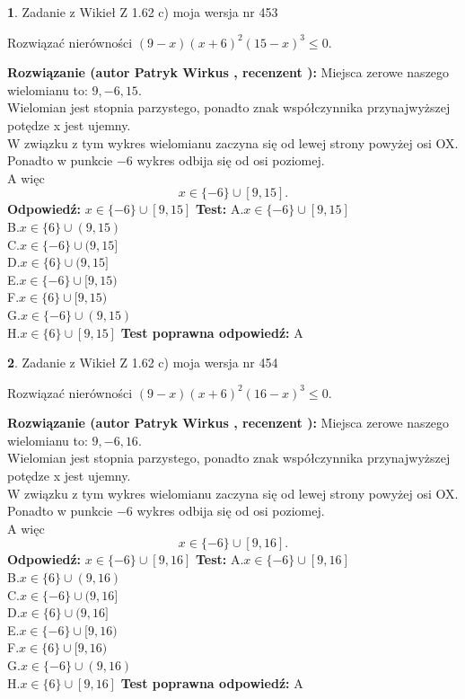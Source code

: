 \documentclass[12pt, a4paper]{article}
\theoremstyle{definition} %
\newtheorem{zad}{}
\newcommand{\zadStart}[1]{\begin{zad}#1\newline}
\newcommand{\zadStop}{\end{zad}}
\newcommand{\rozwStart}[2]{\noindent \textbf{Rozwiązanie (autor #1 , recenzent #2): }\newline}
\newcommand{\rozwStop}{\newline}
\newcommand{\odpStart}{\noindent \textbf{Odpowiedź:}\newline}
\newcommand{\odpStop}{\newline}
\newcommand{\testStart}{\noindent \textbf{Test:}\newline}
\newcommand{\testStop}{\newline}
\newcommand{\kluczStart}{\noindent \textbf{Test poprawna odpowiedź:}\newline}
\newcommand{\kluczStop}{\newline}
\begin{document}
\zadStart{Zadanie z Wikieł Z 1.62 c) moja wersja nr 453}

Rozwiązać nierówności $(9-x)(x+6)^{2}(15-x)^{3}\le0$.
\zadStop
\rozwStart{Patryk Wirkus}{}
Miejsca zerowe naszego wielomianu to: $9, -6, 15$.\\
Wielomian jest stopnia parzystego, ponadto znak współczynnika przy\linebreak najwyższej potędze x jest ujemny.\\ W związku z tym wykres wielomianu zaczyna się od lewej strony powyżej osi OX.\\
Ponadto w punkcie $-6$ wykres odbija się od osi poziomej.\\
A więc $$x \in \{-6\} \cup [9,15].$$
\rozwStop
\odpStart
$x \in \{-6\} \cup [9,15]$
\odpStop
\testStart
A.$x \in \{-6\} \cup [9,15]$\\
B.$x \in \{6\} \cup (9,15)$\\
C.$x \in \{-6\} \cup (9,15]$\\
D.$x \in \{6\} \cup (9,15]$\\
E.$x \in \{-6\} \cup [9,15)$\\
F.$x \in \{6\} \cup [9,15)$\\
G.$x \in \{-6\} \cup (9,15)$\\
H.$x \in \{6\} \cup [9,15]$
\testStop
\kluczStart
A
\kluczStop



\zadStart{Zadanie z Wikieł Z 1.62 c) moja wersja nr 454}

Rozwiązać nierówności $(9-x)(x+6)^{2}(16-x)^{3}\le0$.
\zadStop
\rozwStart{Patryk Wirkus}{}
Miejsca zerowe naszego wielomianu to: $9, -6, 16$.\\
Wielomian jest stopnia parzystego, ponadto znak współczynnika przy\linebreak najwyższej potędze x jest ujemny.\\ W związku z tym wykres wielomianu zaczyna się od lewej strony powyżej osi OX.\\
Ponadto w punkcie $-6$ wykres odbija się od osi poziomej.\\
A więc $$x \in \{-6\} \cup [9,16].$$
\rozwStop
\odpStart
$x \in \{-6\} \cup [9,16]$
\odpStop
\testStart
A.$x \in \{-6\} \cup [9,16]$\\
B.$x \in \{6\} \cup (9,16)$\\
C.$x \in \{-6\} \cup (9,16]$\\
D.$x \in \{6\} \cup (9,16]$\\
E.$x \in \{-6\} \cup [9,16)$\\
F.$x \in \{6\} \cup [9,16)$\\
G.$x \in \{-6\} \cup (9,16)$\\
H.$x \in \{6\} \cup [9,16]$
\testStop
\kluczStart
A
\kluczStop
\end{document}
